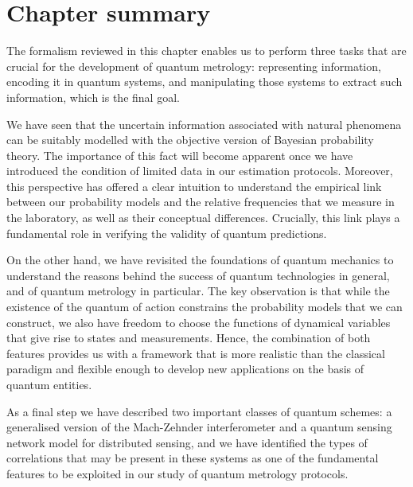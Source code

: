 \section{Chapter summary}

The formalism reviewed in this chapter enables us to perform three tasks that are crucial for the development of quantum metrology: representing information, encoding it in quantum systems, and manipulating those systems to extract such information, which is the final goal.

We have seen that the uncertain information associated with natural phenomena can be suitably modelled with the objective version of Bayesian probability theory. The importance of this fact will become apparent once we have introduced the condition of limited data in our estimation protocols. Moreover, this perspective has offered a clear intuition to understand the empirical link between our probability models and the relative frequencies that we measure in the laboratory, as well as their conceptual differences. Crucially, this link plays a fundamental role in verifying the validity of quantum predictions.

On the other hand, we have revisited the foundations of quantum mechanics to understand the reasons behind the success of quantum technologies in general, and of quantum metrology in particular. The key observation is that while the existence of the quantum of action constrains the probability models that we can construct, we also have freedom to choose the functions of dynamical variables that give rise to states and measurements. Hence, the combination of both features provides us with a framework that is more realistic than the classical paradigm and flexible enough to develop new applications on the basis of quantum entities.

As a final step we have described two important classes of quantum schemes: a generalised version of the Mach-Zehnder interferometer and a quantum sensing network model for distributed sensing, and we have identified the types of correlations that may be present in these systems as one of the fundamental features to be exploited in our study of quantum metrology protocols. 